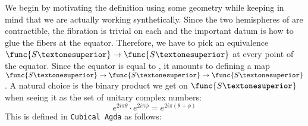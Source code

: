We begin by motivating the definition using some geometry while
keeping in mind that we are actually working synthetically. Since the
two hemispheres of  are contractible, the fibration is
trivial on each and the important datum is how to glue the fibers at
the equator. Therefore, we have to pick an equivalence
\( \func{S¹} \to \func{S¹} \) at every point of the equator.  Since
the equator is equal to , it amounts to defining a map
\( \func{S¹} \to \func{S¹} \to \func{S¹} \). A natural choice is the
binary product we get on \( \func{S¹} \) when seeing it as the set of
unitary complex numbers:
\[
e^{2i\pi \theta} \cdot e^{2i\pi \phi} = e^{2i\pi (\theta + \phi)}
\]
This is defined in \texttt{Cubical Agda} as follows:
%

